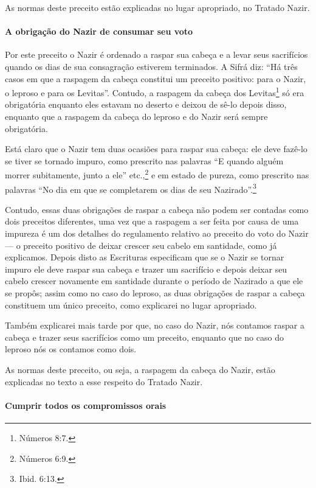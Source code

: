 As normas deste preceito estão explicadas no lugar apropriado, no Tratado Nazir.

\paragraph{A obrigação do Nazir de consumar seu voto}

Por este preceito o Nazir é ordenado a raspar sua cabeça e a levar seus
sacrifícios quando os dias de sua consagração estiverem terminados. A
Sifrá diz: ``Há três casos em que a raspagem da cabeça constitui um
preceito positivo: para o Nazir, o leproso e para os Levitas''.
Contudo, a raspagem da cabeça dos Levitas\footnote{Números 8:7.} só era
obrigatória enquanto eles estavam no deserto e deixou de sê-lo depois disso, enquanto que a raspagem da cabeça do leproso e do Nazir será sempre obrigatória.

Está claro que o Nazir tem duas ocasiões para raspar sua cabeça: ele
deve fazê-lo se tiver se tornado impuro, como prescrito nas palavras ``E
quando alguém morrer subitamente, junto a ele'' etc.,\footnote{Números 6:9.} e
em estado de pureza, como prescrito nas palavras ``No dia em que se
completarem os dias de seu Nazirado''.\footnote{Ibid. 6:13.}

Contudo, essas duas obrigações de raspar a cabeça não podem ser contadas
como dois preceitos diferentes, uma vez que a raspagem a ser feita por
causa de uma impureza é um dos detalhes do regulamento relativo ao
preceito do voto do Nazir --- o preceito positivo de deixar crescer seu
cabelo em santidade, como já explicamos. Depois disto as Escrituras
especificam que se o Nazir se tornar impuro ele deve raspar sua cabeça e
trazer um sacrifício e depois deixar seu cabelo crescer novamente em
santidade durante o período de Nazirado a que ele se propôs; assim como
no caso do leproso, as duas obrigações de raspar a cabeça constituem um
único preceito, como explicarei no lugar apropriado.

Também explicarei mais tarde por que, no caso do Nazir, nós contamos
raspar a cabeça e trazer seus sacrifícios como um preceito, enquanto que
no caso do leproso nós os contamos como dois.

As normas deste preceito, ou seja, a raspagem da cabeça do Nazir, estão
explicadas no texto a esse respeito do Tratado Nazir.

\paragraph{Cumprir todos os compromissos orais}

